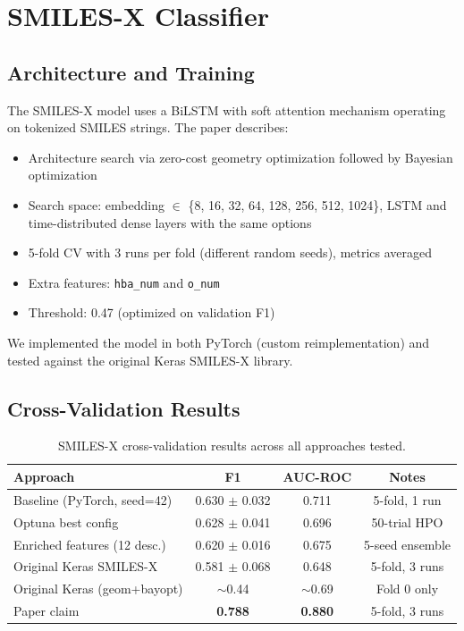 \documentclass[11pt,a4paper]{article}
\begin{document}
\section{SMILES-X Classifier}

\subsection{Architecture and Training}

The SMILES-X model uses a BiLSTM with soft attention mechanism operating on tokenized SMILES strings. The paper describes:
\begin{itemize}[nosep]
    \item Architecture search via zero-cost geometry optimization followed by Bayesian optimization
    \item Search space: embedding $\in$ \{8, 16, 32, 64, 128, 256, 512, 1024\}, LSTM and time-distributed dense layers with the same options
    \item 5-fold CV with 3 runs per fold (different random seeds), metrics averaged
    \item Extra features: \texttt{hba\_num} and \texttt{o\_num}
    \item Threshold: 0.47 (optimized on validation F1)
\end{itemize}

We implemented the model in both PyTorch (custom reimplementation) and tested against the original Keras SMILES-X library.

\subsection{Cross-Validation Results}

\begin{table}[H]
\centering
\caption{SMILES-X cross-validation results across all approaches tested.}
\label{tab:smilesx_cv}
\begin{tabular}{lccc}
\toprule
Approach & F1 & AUC-ROC & Notes \\
\midrule
Baseline (PyTorch, seed=42) & 0.630 $\pm$ 0.032 & 0.711 & 5-fold, 1 run \\
Optuna best config & 0.628 $\pm$ 0.041 & 0.696 & 50-trial HPO \\
Enriched features (12 desc.) & 0.620 $\pm$ 0.016 & 0.675 & 5-seed ensemble \\
Original Keras SMILES-X & 0.581 $\pm$ 0.068 & 0.648 & 5-fold, 3 runs \\
Original Keras (geom+bayopt) & $\sim$0.44 & $\sim$0.69 & Fold 0 only \\
\midrule
Paper claim & \textbf{0.788} & \textbf{0.880} & 5-fold, 3 runs \\
\bottomrule
\end{tabular}
\end{table}
\end{document}
